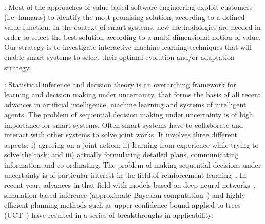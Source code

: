 \documentclass[12pt]{article}
\begin{document}
:  
Most of the approaches of value-based software
engineering exploit customers (i.e. humans) to identify the most promising solution, according to a defined value function.
In the context of smart systems, new methodologies are needed in order to select the best solution according to a multi-dimensional notion of value. Our strategy is
to investigate interactive machine learning techniques that will enable smart systems to select their optimal evolution and/or adaptation strategy.


: 
Statistical inference and decision theory is an overarching framework
for learning and decision making under uncertainty, that forms the
basis of all recent advances in artificial intelligence, machine
learning and systems of intelligent agents. 
The problem of sequential decision making under uncertainty is of high importance for smart systems. 
Often smart systems have to collaborate and interact with other systems to solve joint works. It involves three
different aspects: i) agreeing on a joint action; ii) learning from experience
while trying to solve the task; and iii) actually formulating detailed plans, communicating information and
co-ordinating. The problem of making sequential decisions under uncertainty is of
particular interest in the field of reinforcement
learning~\cite{suba,BertsekasTsitsiklis:NDP}. In recent year, advances
in that field with models based on deep neural
networks~\cite{mnih2015human}, simulation-based inference (approximate
Bayesian computation~\cite{icml:abcrl}) and highly efficient planning
methods such as upper confidence bound applied to trees
(UCT~\cite{ECML:Kocsis+Szepesvari:2006}) have resulted in a series of
breakthroughs in applicability. %
\end{document}
